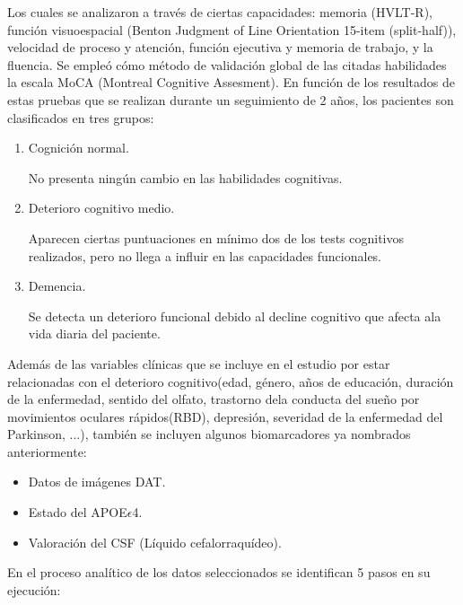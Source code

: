 \documentclass[12pt]{article}
\begin{document}
Los cuales se analizaron a través de ciertas capacidades: memoria (HVLT-R), función visuoespacial (Benton Judgment of Line Orientation 15-item (split-half)), velocidad de proceso y atención, función ejecutiva y memoria de trabajo, y la fluencia. Se empleó cómo método de validación global de las citadas habilidades la escala MoCA (Montreal Cognitive Assesment). En función de los resultados de estas pruebas que se realizan durante un seguimiento de 2 años, los pacientes son clasificados en tres grupos:
\begin{enumerate}
	\item Cognición normal.
	
	No presenta ningún cambio en las habilidades cognitivas.
	
	\item Deterioro cognitivo medio.
	
	Aparecen ciertas puntuaciones en mínimo dos de los tests cognitivos  realizados, pero no llega a influir en las capacidades funcionales.
	
	\item Demencia.	
	
	Se detecta un deterioro funcional debido al decline cognitivo que afecta ala vida diaria del paciente.
\end{enumerate}

Además de las variables clínicas que se incluye en el estudio por estar relacionadas con el deterioro cognitivo(edad, género, años de educación, duración de la enfermedad, sentido del olfato, trastorno dela conducta del sueño por movimientos oculares rápidos(RBD), depresión, severidad de la enfermedad del Parkinson, ...), también se incluyen algunos biomarcadores ya nombrados anteriormente: 
\begin{itemize}
	\item Datos de imágenes DAT.
	\item Estado del APOE$\epsilon$4.
	\item Valoración del CSF (Líquido cefalorraquídeo).
\end{itemize}

En el proceso analítico de los datos seleccionados se identifican 5 pasos en su ejecución:
\end{document}
